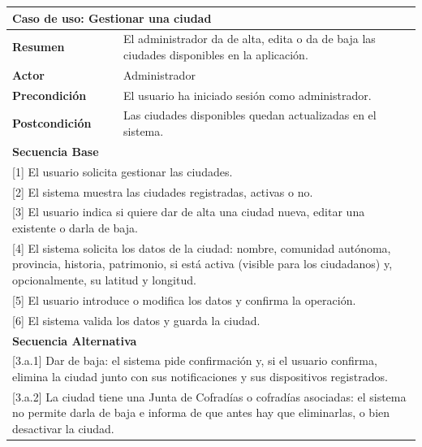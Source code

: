 \begin{table}[h!]
    \centering
    \renewcommand{\arraystretch}{1.5}

    \begin{tabular}{|p{4cm}|p{11cm}|}
        \hline
        \multicolumn{2}{|l|}{\textbf{Caso de uso: Gestionar una ciudad}} \\
        \hline
        \textbf{Resumen} & El administrador da de alta, edita o da de baja las ciudades disponibles en la aplicación. \\
        \hline
        \textbf{Actor} & Administrador \\
        \hline
        \textbf{Precondición} & El usuario ha iniciado sesión como administrador. \\
        \hline
        \textbf{Postcondición} & Las ciudades disponibles quedan actualizadas en el sistema. \\
        \hline
        \multicolumn{2}{|l|}{\textbf{Secuencia Base}} \\
        \hline
        \multicolumn{2}{|p{15cm}|}{ [1] El usuario solicita gestionar las ciudades. } \\
        \hline
        \multicolumn{2}{|p{15cm}|}{ [2] El sistema muestra las ciudades registradas, activas o no. } \\
        \hline
        \multicolumn{2}{|p{15cm}|}{ [3] El usuario indica si quiere dar de alta una ciudad nueva, editar una existente o darla de baja. } \\
        \hline
        \multicolumn{2}{|p{15cm}|}{ [4] El sistema solicita los datos de la ciudad: nombre, comunidad autónoma, provincia, historia, patrimonio, si está activa (visible para los ciudadanos) y, opcionalmente, su latitud y longitud. } \\
        \hline
        \multicolumn{2}{|p{15cm}|}{ [5] El usuario introduce o modifica los datos y confirma la operación. } \\
        \hline
        \multicolumn{2}{|p{15cm}|}{ [6] El sistema valida los datos y guarda la ciudad. } \\
        \hline
        \multicolumn{2}{|l|}{\textbf{Secuencia Alternativa}} \\
        \hline
        \multicolumn{2}{|p{15cm}|}{ [3.a.1] Dar de baja: el sistema pide confirmación y, si el usuario confirma, elimina la ciudad junto con sus notificaciones y sus dispositivos registrados. } \\
        \hline
        \multicolumn{2}{|p{15cm}|}{ [3.a.2] La ciudad tiene una Junta de Cofradías o cofradías asociadas: el sistema no permite darla de baja e informa de que antes hay que eliminarlas, o bien desactivar la ciudad. } \\

\end{tabular}
\end{table}
